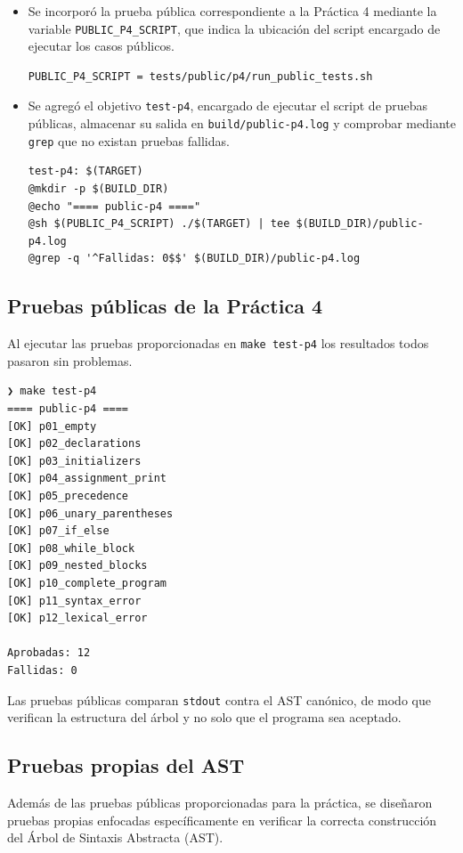 \documentclass[12pt,letterpaper]{article}
\begin{document}
\begin{itemize}
\item Se incorporó la prueba pública correspondiente a la Práctica 4 mediante la variable
\texttt{PUBLIC\_P4\_SCRIPT}, que indica la ubicación del script encargado de ejecutar los casos públicos.

\begin{verbatim}
PUBLIC_P4_SCRIPT = tests/public/p4/run_public_tests.sh
\end{verbatim}

\item Se agregó el objetivo \texttt{test-p4}, encargado de ejecutar el script de pruebas públicas, almacenar
su salida en \texttt{build/public-p4.log} y comprobar mediante \texttt{grep} que no existan pruebas fallidas.

\begin{verbatim}
test-p4: $(TARGET)
@mkdir -p $(BUILD_DIR)
@echo "==== public-p4 ===="
@sh $(PUBLIC_P4_SCRIPT) ./$(TARGET) | tee $(BUILD_DIR)/public-p4.log
@grep -q '^Fallidas: 0$$' $(BUILD_DIR)/public-p4.log
\end{verbatim}

\end{itemize}

\subsection*{Pruebas públicas de la Práctica 4}

Al ejecutar las pruebas proporcionadas en \texttt{make test-p4} los resultados todos pasaron sin problemas.

\begin{verbatim}
❯ make test-p4
==== public-p4 ====
[OK] p01_empty
[OK] p02_declarations
[OK] p03_initializers
[OK] p04_assignment_print
[OK] p05_precedence
[OK] p06_unary_parentheses
[OK] p07_if_else
[OK] p08_while_block
[OK] p09_nested_blocks
[OK] p10_complete_program
[OK] p11_syntax_error
[OK] p12_lexical_error

Aprobadas: 12
Fallidas: 0
\end{verbatim}

Las pruebas públicas comparan \texttt{stdout} contra el AST canónico, de modo que verifican la estructura del árbol y no solo que el programa sea aceptado.

\subsection*{Pruebas propias del AST}
Además de las pruebas públicas proporcionadas para la práctica, se diseñaron pruebas propias enfocadas específicamente en verificar la correcta construcción del Árbol de Sintaxis Abstracta (AST).
\end{document}

